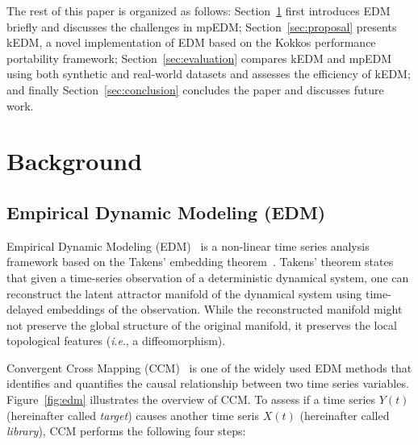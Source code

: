 \documentclass[sigconf]{acmart}
\begin{document}
The rest of this paper is organized as follows: Section~\ref{sec:background}
first introduces EDM briefly and discusses the challenges in mpEDM\@;
Section~\ref{sec:proposal} presents kEDM, a novel implementation of EDM based on the Kokkos performance portability framework;
Section~\ref{sec:evaluation} compares kEDM and mpEDM using both synthetic and real-world datasets and assesses the efficiency of kEDM\@; and finally
Section~\ref{sec:conclusion} concludes the paper and discusses future work.

\section{Background}\label{sec:background}

\subsection{Empirical Dynamic Modeling (EDM)}\label{sec:edm}

Empirical Dynamic Modeling (EDM)~\cite{Chang2017,Ye2015} is a non-linear time
series analysis framework based on the Takens' embedding
theorem~\cite{Takens1981,Deyle2011}. Takens' theorem states that given a time-series
observation of a deterministic dynamical system, one can reconstruct the
latent attractor manifold of the dynamical system using time-delayed
embeddings of the observation. While the reconstructed manifold might not
preserve the global structure of the original manifold, it preserves the local
topological features (\textit{i}.\textit{e}., a diffeomorphism).

Convergent Cross Mapping (CCM)~\cite{Sugihara2012,Natsukawa2017,VanBerkel2020}
is one of the widely used EDM methods that identifies and quantifies the causal
relationship between two time series variables. Figure~\ref{fig:edm} illustrates the
overview of CCM\@. To assess if a time series $Y(t)$ (hereinafter called \textit{target})
causes another time seris $X(t)$ (hereinafter called \textit{library}), CCM performs
the following four steps:
\end{document}
